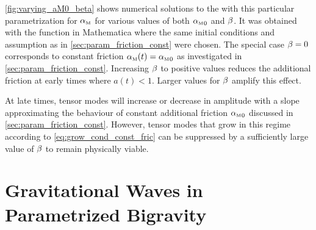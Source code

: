 \documentclass[12pt,parskip=half]{scrreprt}
\begin{document}
\autoref{fig:varying_aM0_beta} shows numerical solutions to the  with this particular parametrization for \({\alpha_{\textnormal{\tiny{M}}}}\) for various values of both \({\alpha_{\textnormal{\tiny{M}}}}_0\) and \(\beta\). It was obtained with the  function in Mathematica where the same initial conditions and assumption as in \autoref{sec:param_friction_const} were chosen. The special case \(\beta=0\) corresponds to constant friction \({\alpha_{\textnormal{\tiny{M}}}}(t)={\alpha_{\textnormal{\tiny{M}}}}_0\) as investigated in \autoref{sec:param_friction_const}. Increasing \(\beta\) to positive values reduces the additional friction at early times where \(a(t) < 1\). Larger values for \(\beta\) amplify this effect. 


At late times, tensor modes will increase or decrease in amplitude with a slope approximating the behaviour of constant additional friction \({\alpha_{\textnormal{\tiny{M}}}}_0\) discussed in \autoref{sec:param_friction_const}. However, tensor modes that grow in this regime according to \eqref{eq:grow_cond_const_fric} can be suppressed by a sufficiently large value of \(\beta\) to remain physically viable. 


\chapter{Gravitational Waves in Parametrized Bigravity}\label{ch:param_bigravity}
\end{document}
